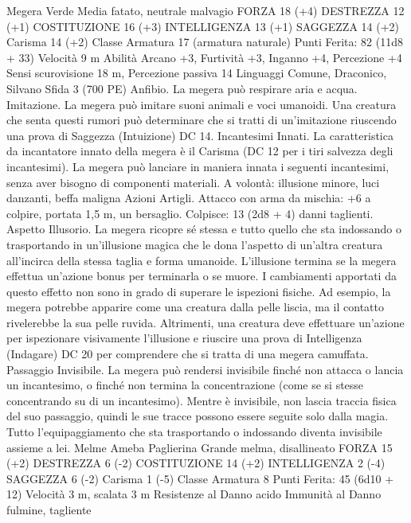 \begin{multicols}{2}
Megera Verde
Media fatato, neutrale malvagio
FORZA 18 (+4)
DESTREZZA 12 (+1)
COSTITUZIONE 16 (+3)
INTELLIGENZA 13 (+1)
SAGGEZZA 14 (+2)
Carisma 14 (+2)
Classe Armatura 17 (armatura naturale)
\hspace*{0pt}\hfill{Punti Ferita}: 82 (11d8 + 33)
Velocità 9 m
Abilità Arcano +3, Furtività +3, Inganno +4, Percezione +4
Sensi scurovisione 18 m, Percezione passiva 14
Linguaggi Comune, Draconico, Silvano
Sfida 3 (700 PE)
Anfibio. La megera può respirare aria e acqua.
Imitazione. La megera può imitare suoni animali e voci
umanoidi. Una creatura che senta questi rumori può determinare
che si tratti di un’imitazione riuscendo una prova di Saggezza
(Intuizione) DC 14.
Incantesimi Innati. La caratteristica da incantatore innato della
megera è il Carisma (DC 12 per i tiri salvezza degli incantesimi).
La megera può lanciare in maniera innata i seguenti incantesimi,
senza aver bisogno di componenti materiali.
A volontà: illusione minore, luci danzanti, beffa maligna
Azioni
Artigli. Attacco con arma da mischia: +6 a colpire, portata 1,5
m, un bersaglio.
Colpisce: 13 (2d8 + 4) danni taglienti.
Aspetto Illusorio. La megera ricopre sé stessa e tutto quello che
sta indossando o trasportando in un’illusione magica che le dona
l’aspetto di un’altra creatura all’incirca della stessa taglia e forma
umanoide. L’illusione termina se la megera effettua un’azione
bonus per terminarla o se muore.
I cambiamenti apportati da questo effetto non sono in grado di
superare le ispezioni fisiche. Ad esempio, la megera potrebbe
apparire come una creatura dalla pelle liscia, ma il contatto
rivelerebbe la sua pelle ruvida. Altrimenti, una creatura deve
effettuare un’azione per ispezionare visivamente l’illusione e
riuscire una prova di Intelligenza (Indagare) DC 20 per
comprendere che si tratta di una megera camuffata.
Passaggio Invisibile. La megera può rendersi invisibile finché
non attacca o lancia un incantesimo, o finché non termina la
concentrazione (come se si stesse concentrando su di un
incantesimo). Mentre è invisibile, non lascia traccia fisica del suo
passaggio, quindi le sue tracce possono essere seguite solo dalla
magia. Tutto l’equipaggiamento che sta trasportando o
indossando diventa invisibile assieme a lei.
Melme
Ameba Paglierina
Grande melma, disallineato
FORZA 15 (+2)
DESTREZZA 6 (-2)
COSTITUZIONE 14 (+2)
INTELLIGENZA 2 (-4)
SAGGEZZA 6 (-2)
Carisma 1 (-5)
Classe Armatura 8
\hspace*{0pt}\hfill{Punti Ferita}: 45 (6d10 + 12)
Velocità 3 m, scalata 3 m
Resistenze al Danno acido
Immunità al Danno fulmine, tagliente

\end{multicols}
